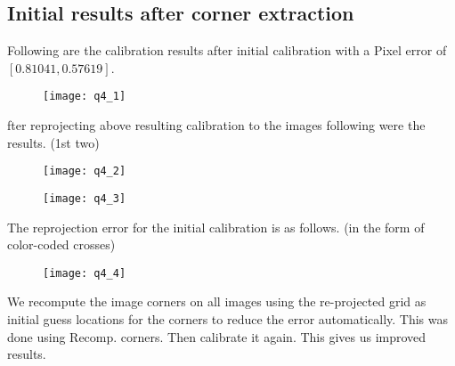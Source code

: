 	\subsection{Initial results after corner extraction}
	\newline
	Following are the calibration results after initial calibration with a Pixel error of ${[0.81041,   0.57619]}$.\newline
	\begin{figure}[position = here]
		\begin{centering}
			\texttt{[image: q4\_1]}\\
		\end{centering}
	\end{figure}
	\newline
	\pagebreak
	\newline fter reprojecting above resulting calibration to the images following were the results. (1st two)\newline
	\begin{figure}[position = here]
		\begin{centering}
			\texttt{[image: q4\_2]}\\
		\end{centering}
	\end{figure}
	\newline
	\begin{figure}[position = here]
		\begin{centering}
			\texttt{[image: q4\_3]}\\
		\end{centering}
	\end{figure}
	\newline
	The reprojection error for the initial calibration is as follows. (in the form of color-coded crosses)\newline
	\pagebreak
	
	
	\newline
	\begin{figure}[position = here]
		\begin{centering}
			\texttt{[image: q4\_4]}\\
		\end{centering}
	\end{figure}
	\newline
	
	We recompute the image corners on all images using the re-projected grid as initial guess locations for the corners to reduce the error automatically. This was done using Recomp. corners.  Then calibrate it again. This gives us improved results.\newline
	
